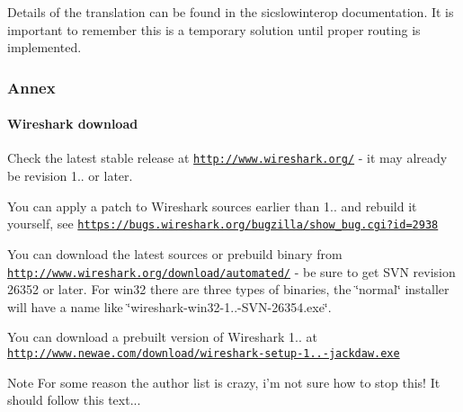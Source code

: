 \-Details of the translation can be found in the sicslowinterop documentation. \-It is important to remember this is a temporary solution until proper routing is implemented.\hypertarget{a00053_Annex}{}\subsubsection{\-Annex}\label{a00053_Annex}
\hypertarget{a00053_annex_wireshark}{}\paragraph{\-Wireshark download}\label{a00053_annex_wireshark}
\begin{DoxyItemize}
\item \-Check the latest stable release at \href{http://www.wireshark.org/}{\tt http\-://www.\-wireshark.\-org/} -\/ it may already be revision 1.. or later. \item \-You can apply a patch to \-Wireshark sources earlier than 1.. and rebuild it yourself, see \href{https://bugs.wireshark.org/bugzilla/show_bug.cgi?id=2938}{\tt https\-://bugs.\-wireshark.\-org/bugzilla/show\-\_\-bug.\-cgi?id=2938} \item \-You can download the latest sources or prebuild binary from \href{http://www.wireshark.org/download/automated/}{\tt http\-://www.\-wireshark.\-org/download/automated/} -\/ be sure to get \-S\-V\-N revision 26352 or later. \-For win32 there are three types of binaries, the \char`\"{}normal\char`\"{} installer will have a name like \char`\"{}wireshark-\/win32-\/1..-\/\-S\-V\-N-\/26354.\-exe\char`\"{}. \item \-You can download a prebuilt version of \-Wireshark 1.. at \href{http://www.newae.com/download/wireshark-setup-1.0.3-jackdaw.exe}{\tt http\-://www.\-newae.\-com/download/wireshark-\/setup-\/1..-\/jackdaw.\-exe}\end{DoxyItemize}
\begin{DoxyNote}{\-Note}
\-For some reason the author list is crazy, i'm not sure how to stop this! \-It should follow this text... 
\end{DoxyNote}
